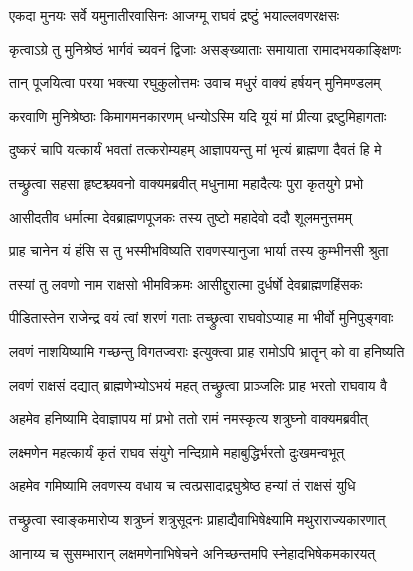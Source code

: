 

\twolineshloka
{एकदा मुनयः सर्वे यमुनातीरवासिनः}
{आजग्मू राघवं द्रष्टुं भयाल्लवणरक्षसः} %

\twolineshloka
{कृत्वाऽग्रे तु मुनिश्रेष्ठं भार्गवं च्यवनं द्विजाः}
{असङ्ख्याताः समायाता रामादभयकाङ्क्षिणः} %

\twolineshloka
{तान् पूजयित्वा परया भक्त्या रघुकुलोत्तमः}
{उवाच मधुरं वाक्यं हर्षयन् मुनिमण्डलम्} %

\twolineshloka
{करवाणि मुनिश्रेष्ठाः किमागमनकारणम्}
{धन्योऽस्मि यदि यूयं मां प्रीत्या द्रष्टुमिहागताः} %

\twolineshloka
{दुष्करं चापि यत्कार्यं भवतां तत्करोम्यहम्}
{आज्ञापयन्तु मां भृत्यं ब्राह्मणा दैवतं हि मे} %

\twolineshloka
{तच्छ्रुत्वा सहसा हृष्टश्च्यवनो वाक्यमब्रवीत्}
{मधुनामा महादैत्यः पुरा कृतयुगे प्रभो} %

\twolineshloka
{आसीदतीव धर्मात्मा देवब्राह्मणपूजकः}
{तस्य तुष्टो महादेवो ददौ शूलमनुत्तमम्} %

\twolineshloka
{प्राह चानेन यं हंसि स तु भस्मीभविष्यति}
{रावणस्यानुजा भार्या तस्य कुम्भीनसी श्रुता} %

\twolineshloka
{तस्यां तु लवणो नाम राक्षसो भीमविक्रमः}
{आसीद्दुरात्मा दुर्धर्षो देवब्राह्मणहिंसकः} %

\twolineshloka
{पीडितास्तेन राजेन्द्र वयं त्वां शरणं गताः}
{तच्छ्रुत्वा राघवोऽप्याह मा भीर्वो मुनिपुङ्गवाः} %

\twolineshloka
{लवणं नाशयिष्यामि गच्छन्तु विगतज्वराः}
{इत्युक्त्वा प्राह रामोऽपि भ्रातॄन् को वा हनिष्यति} %

\twolineshloka
{लवणं राक्षसं दद्यात् ब्राह्मणेभ्योऽभयं महत्}
{तच्छ्रुत्वा प्राञ्जलिः प्राह भरतो राघवाय वै} %

\twolineshloka
{अहमेव हनिष्यामि देवाज्ञापय मां प्रभो}
{ततो रामं नमस्कृत्य शत्रुघ्नो वाक्यमब्रवीत्} %

\twolineshloka
{लक्ष्मणेन महत्कार्यं कृतं राघव संयुगे}
{नन्दिग्रामे महाबुद्धिर्भरतो दुःखमन्वभूत्} %

\twolineshloka
{अहमेव गमिष्यामि लवणस्य वधाय च}
{त्वत्प्रसादाद्रघुश्रेष्ठ हन्यां तं राक्षसं युधि} %

\twolineshloka
{तच्छ्रुत्वा स्वाङ्कमारोप्य शत्रुघ्नं शत्रुसूदनः}
{प्राहाद्यैवाभिषेक्ष्यामि मथुराराज्यकारणात्} %

\twolineshloka
{आनाय्य च सुसम्भारान् लक्षमणेनाभिषेचने}
{अनिच्छन्तमपि स्नेहादभिषेकमकारयत्} %


